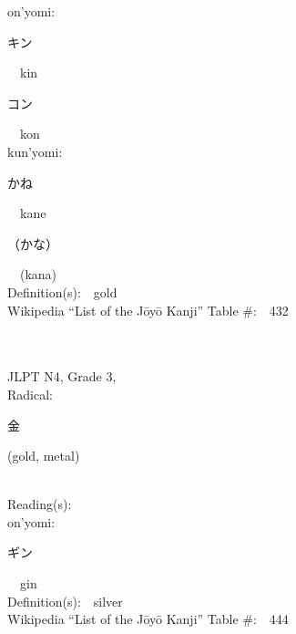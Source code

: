 \begin{multicols}{2}
{\hspace*{1em}}on'yomi:\ \ \\
{\hspace*{2em}}{\begin{CJK}{UTF8}{min} キン \end{CJK}}\ \ kin\ \ \\
{\hspace*{2em}}{\begin{CJK}{UTF8}{min} コン \end{CJK}}\ \ kon\ \ \\
{\hspace*{1em}}kun'yomi:\ \ \\
{\hspace*{2em}}{\begin{CJK}{UTF8}{min} かね \end{CJK}}\ \ kane\ \ \\
{\hspace*{2em}}{\begin{CJK}{UTF8}{min} （かな） \end{CJK}}\ \ (kana)\ \ \\
Definition(s):\ \ gold \\
Wikipedia ``List of the J\=oy\=o Kanji'' Table \#:\ \ 432 \\
\ \ \\
{\fontsize{34pt}{40pt}  }\ \ \\  %
{JLPT N4, Grade 3, \\Radical:\ \ {\begin{CJK}{UTF8}{min} 金 \end{CJK}} (gold, metal) } \\
Reading(s):\ \ \\
{\hspace*{1em}}on'yomi:\ \ \\
{\hspace*{2em}}{\begin{CJK}{UTF8}{min} ギン \end{CJK}}\ \ gin\ \ \\
Definition(s):\ \ silver \\
Wikipedia ``List of the J\=oy\=o Kanji'' Table \#:\ \ 444 \\
\ \ \\
{\fontsize{34pt}{40pt}  }\ \ \\  %

\end{multicols}
